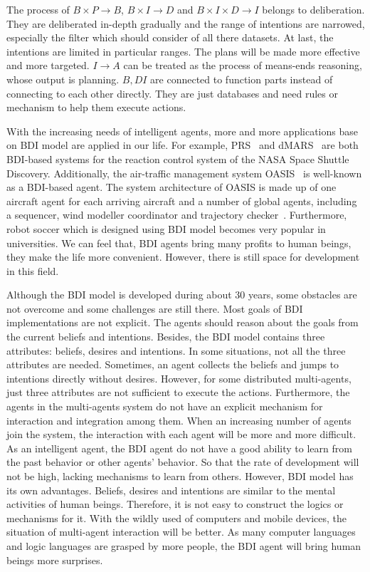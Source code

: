 The process of $B \times P \to B$, $B \times I \to D$ and $B \times I \times D \to I$ belongs to deliberation.
They are deliberated in-depth gradually and the range of intentions are narrowed, especially the filter which should consider of all there datasets.
At last, the intentions are limited in particular ranges.
The plans will be made more effective and more targeted.
$I \to A $ can be treated as the process of means-ends reasoning, whose output is planning.
$B,D I$ are connected to function parts instead of connecting to each other directly.
They are just databases and need rules or mechanism to help them execute actions.

With the increasing needs of intelligent agents, more and more applications base on BDI model are applied in our life.
For example, PRS~\cite{Ingrand_PRS_1992} and dMARS~\cite{Mark_dMARS_2004} are both BDI-based systems for the reaction control system of the NASA Space Shuttle Discovery.
Additionally, the air-traffic management system OASIS~\cite{Magnus_OASIS_1992} is well-known as a BDI-based agent.
The system architecture of OASIS is made up of one aircraft agent for each arriving aircraft and a number of global agents, including a sequencer, wind modeller coordinator and trajectory checker~\cite{Rao_BDITheory_1995}.
Furthermore, robot soccer which is designed using BDI model becomes very popular in universities.
We can feel that, BDI agents bring many profits to human beings, they make the life more convenient.
However, there is still space for development in this field.

Although the BDI model is developed during about 30 years, some obstacles are not overcome and some challenges are still there.
Most goals of BDI implementations are not explicit.
The agents should reason about the goals from the current beliefs and intentions.
Besides, the BDI model contains three attributes: beliefs, desires and intentions.
In some situations, not all the three attributes are needed.
Sometimes, an agent collects the beliefs and jumps to intentions directly without desires.
However, for some distributed multi-agents, just three attributes are not sufficient to execute the actions.
Furthermore, the agents in the multi-agents system do not have an explicit mechanism for interaction and integration among them.
When an increasing number of agents join the system, the interaction with each agent will be more and more difficult.
As an intelligent agent, the BDI agent do not have a good ability to learn from the past behavior or other agents’ behavior.
So that the rate of development will not be high, lacking mechanisms to learn from others.
However, BDI model has its own advantages.
Beliefs, desires and intentions are similar to the mental activities of human beings.
Therefore, it is not easy to construct the logics or mechanisms for it.
With the wildly used of computers and mobile devices, the situation of multi-agent interaction will be better.
As many computer languages and logic languages are grasped by more people, the BDI agent will bring human beings more surprises.


